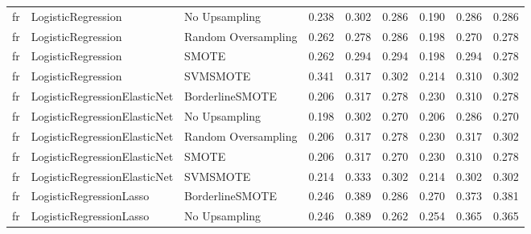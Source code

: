 \begin{tabular}{lllllllll}
      fr &           LogisticRegression &       No Upsampling & 0.238 &                     0.302 &                 0.286 &                  0.190 &                                   0.286 &     0.286 \\
      fr &           LogisticRegression & Random Oversampling & 0.262 &                     0.278 &                 0.286 &                  0.198 &                                   0.270 &     0.278 \\
      fr &           LogisticRegression &               SMOTE & 0.262 &                     0.294 &                 0.294 &                  0.198 &                                   0.294 &     0.278 \\
      fr &           LogisticRegression &            SVMSMOTE & 0.341 &                     0.317 &                 0.302 &                  0.214 &                                   0.310 &     0.302 \\
      fr & LogisticRegressionElasticNet &     BorderlineSMOTE & 0.206 &                     0.317 &                 0.278 &                  0.230 &                                   0.310 &     0.278 \\
      fr & LogisticRegressionElasticNet &       No Upsampling & 0.198 &                     0.302 &                 0.270 &                  0.206 &                                   0.286 &     0.270 \\
      fr & LogisticRegressionElasticNet & Random Oversampling & 0.206 &                     0.317 &                 0.278 &                  0.230 &                                   0.317 &     0.302 \\
      fr & LogisticRegressionElasticNet &               SMOTE & 0.206 &                     0.317 &                 0.270 &                  0.230 &                                   0.310 &     0.278 \\
      fr & LogisticRegressionElasticNet &            SVMSMOTE & 0.214 &                     0.333 &                 0.302 &                  0.214 &                                   0.302 &     0.302 \\
      fr &      LogisticRegressionLasso &     BorderlineSMOTE & 0.246 &                     0.389 &                 0.286 &                  0.270 &                                   0.373 &     0.381 \\
      fr &      LogisticRegressionLasso &       No Upsampling & 0.246 &                     0.389 &                 0.262 &                  0.254 &                                   0.365 &     0.365 \\

\end{tabular}
